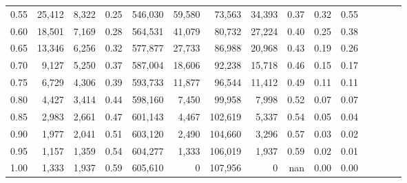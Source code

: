 \begin{tabular}{rrrcrrrrrrrrrrr}
0.55 &  25,412 &   8,322 &                                       0.25 &  546,030 &   59,580 &   73,563 &   34,393 &  0.37 &  0.32 &                         0.55 \\
0.60 &  18,501 &   7,169 &                                       0.28 &  564,531 &   41,079 &   80,732 &   27,224 &  0.40 &  0.25 &                         0.38 \\
0.65 &  13,346 &   6,256 &                                       0.32 &  577,877 &   27,733 &   86,988 &   20,968 &  0.43 &  0.19 &                         0.26 \\
0.70 &   9,127 &   5,250 &                                       0.37 &  587,004 &   18,606 &   92,238 &   15,718 &  0.46 &  0.15 &                         0.17 \\
0.75 &   6,729 &   4,306 &                                       0.39 &  593,733 &   11,877 &   96,544 &   11,412 &  0.49 &  0.11 &                         0.11 \\
0.80 &   4,427 &   3,414 &                                       0.44 &  598,160 &    7,450 &   99,958 &    7,998 &  0.52 &  0.07 &                         0.07 \\
0.85 &   2,983 &   2,661 &                                       0.47 &  601,143 &    4,467 &  102,619 &    5,337 &  0.54 &  0.05 &                         0.04 \\
0.90 &   1,977 &   2,041 &                                       0.51 &  603,120 &    2,490 &  104,660 &    3,296 &  0.57 &  0.03 &                         0.02 \\
0.95 &   1,157 &   1,359 &                                       0.54 &  604,277 &    1,333 &  106,019 &    1,937 &  0.59 &  0.02 &                         0.01 \\
1.00 &   1,333 &   1,937 &                                       0.59 &  605,610 &        0 &  107,956 &        0 &   nan &  0.00 &                         0.00 \\
\bottomrule
\end{tabular}
